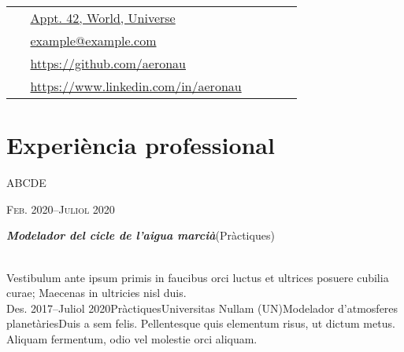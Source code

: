 \documentclass[10pt]{article} %
\newcommand{\workposition}[6]{
	\expandafter\ifstrequal\expandafter{#3}{}{}{{\raggedright #3}\hfill{\textsc{#1}}\\} %
	\expandafter\ifstrequal\expandafter{#4}{}{}{{\raggedright\large\textit{\textbf{#4}}\hfill\expandafter\ifstrequal\expandafter{#2}{}{}{{\footnotesize (#2)}}}\\[4pt]} %
	\expandafter\ifstrequal\expandafter{#5}{}{}{#5\\} %
}
\newcommand{\tableentry}[3]{
	\textsc{#1} & #2\expandafter\ifstrequal\expandafter{#3}{}{\\}{\\[3pt]} %
}
\begin{document}
\begin{paracol}{2}

 
\vspace{-0.05\textheight}
 \colorbox{shade}{
\begin{supertabular}{p{0.05\linewidth}|p{0.775\linewidth}}
\raisebox{-1pt}{\faHome}
 & \href{https://goo.gl/maps/NiMqg2mtYFxLyKfM8}{Appt. 42, World, Universe}
\\

\raisebox{0pt}{\small\faEnvelope}
 & \href{mailto:example@example.com}{example@example.com}
\\

\raisebox{-1pt}{\faGithub}
 & \href{https://github.com/aeronau}{https://github.com/aeronau}
\\

\raisebox{-1pt}{\faLinkedinSquare}
 & \href{https://www.linkedin.com/in/aeronau}{https://www.linkedin.com/in/aeronau}
\\

\end{supertabular}
}
 
\section{Experiència professional}
 \workposition{Feb. 2020--Juliol 2020}{Pràctiques}{ABCDE}{Modelador del cicle de l'aigua marcià}{Vestibulum ante ipsum primis in faucibus orci luctus et ultrices posuere cubilia curae; Maecenas in ultricies nisl duis.}
 

 \workposition{Des. 2017--Juliol 2020}{Pràctiques}{Universitas Nullam (UN)}{Modelador d'atmosferes planetàries}{Duis a sem felis. Pellentesque quis elementum risus, ut dictum metus. Aliquam fermentum, odio vel molestie orci aliquam.}
 


\end{paracol}
\end{document}

